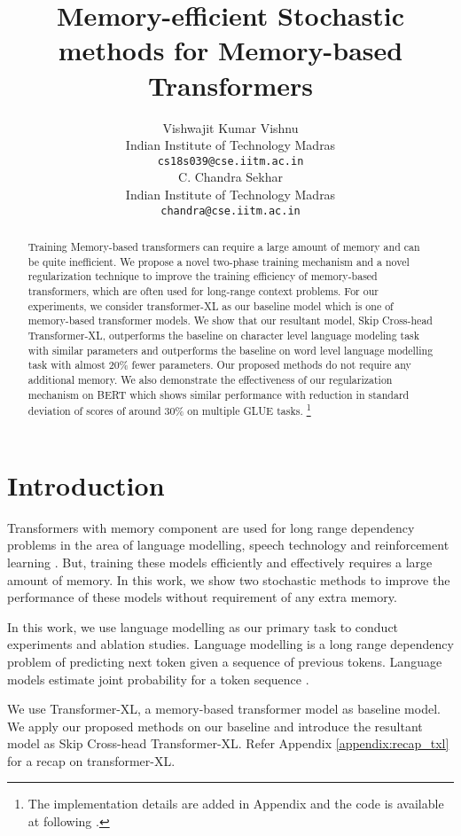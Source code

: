 \documentclass[11pt]{article}
\title{Memory-efficient Stochastic methods for Memory-based Transformers}
\author{Vishwajit Kumar Vishnu \\
  Indian Institute of Technology Madras \\
  \texttt{cs18s039@cse.iitm.ac.in} \\\And
  C. Chandra Sekhar \\
  Indian Institute of Technology Madras \\
  \texttt{chandra@cse.iitm.ac.in} \\}
\begin{document}
\maketitle
\begin{abstract}
Training Memory-based transformers can require a large amount of memory and can be quite inefficient. We propose a novel two-phase training mechanism and a novel regularization technique to improve the training efficiency of memory-based transformers, which are often used for long-range context problems. For our experiments, we consider transformer-XL as our baseline model which is one of memory-based transformer models. We show that our resultant model, Skip Cross-head Transformer-XL, outperforms the baseline on character level language modeling task with similar parameters and outperforms the baseline on word level language modelling task with almost 20\% fewer parameters. Our proposed methods do not require any additional memory. We also demonstrate the effectiveness of our regularization mechanism on BERT which shows similar performance with reduction in standard deviation of scores of around 30\% on multiple GLUE tasks. \footnote{ The implementation details are added in Appendix and   the code is available at following .}

\end{abstract}

\section{Introduction}

Transformers with memory component are used for long range dependency problems in the area of language modelling, speech technology and reinforcement learning \citep{DBLP:conf/iclr/RaePJHL20}. But, training these models efficiently and effectively requires a large amount of memory. In this work, we show two stochastic methods to improve the performance of these models without requirement of any extra memory. 

In this work, we use language modelling as our primary task to conduct experiments and ablation studies. Language modelling is a long range dependency problem of predicting next token given a sequence of previous tokens. Language models estimate joint probability   for a token sequence .





We use Transformer-XL, a memory-based transformer model as baseline model. We apply our proposed methods on our baseline and introduce the resultant model as Skip Cross-head Transformer-XL. Refer Appendix \ref{appendix:recap_txl} for a recap on transformer-XL.
\end{document}
